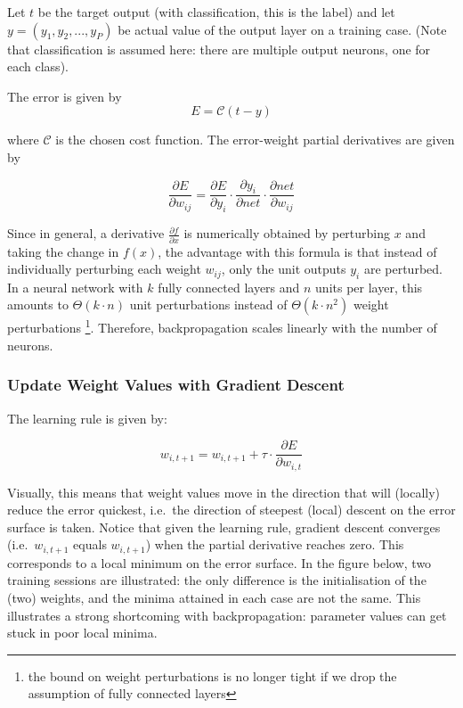 \documentclass[a4paper,11pt]{article}
\begin{document}
Let $t$ be the target output (with classification, this is the label) and let $y = (y_{1}, y_{2}, ..., y_{P})$ be actual value of the output layer on a training case. (Note that classification is assumed here: there are multiple output neurons, one for each class).

The error is given by 
\begin{equation}
E = \mathcal{C}(t-y)
\end{equation}

where $\mathcal{C}$ is the chosen cost function. The error-weight partial derivatives are given by

\begin{equation}
\frac{\partial{E}}{\partial{w_{ij}}} = \frac{\partial{E}}{\partial{y_{i}}} \cdot \frac{\partial{y_{i}}}{\partial{net}} \cdot \frac{\partial{net}}{\partial{w_{ij}}}
\end{equation}

Since in general, a derivative $\frac{\partial{f}}{\partial{x}}$ is numerically obtained by perturbing $x$ and taking the change in $f(x)$, the advantage with this formula is that instead of individually perturbing each weight $w_{ij}$, only the unit outputs $y_{i}$ are perturbed. In a neural network with $k$ fully connected layers and $n$ units per layer, this amounts to $\Theta(k \cdot n)$ unit perturbations instead of $\Theta(k \cdot n^{2})$ weight perturbations \footnote{the bound on weight perturbations is no longer tight if we drop the assumption of fully connected layers}. Therefore, backpropagation scales linearly with the number of neurons. \\

\subsubsection{Update Weight Values with Gradient Descent}

The learning rule is given by:

\begin{equation}
 w_{i,t+1} = w_{i,t+1} + \tau \cdot \frac{\partial{E}}{\partial{w_{i,t}}}
 \label{eqn:learning_rule}
\end{equation}

Visually, this means that weight values move in the direction that will (locally) reduce the error quickest, i.e.\ the direction of steepest (local) descent on the error surface is taken. Notice that given the learning rule, gradient descent converges (i.e.\ $w_{i,t+1}$ equals $w_{i,t+1}$) when the partial derivative reaches zero. This corresponds to a local minimum on the error surface. In the figure below, two training sessions are illustrated: the only difference is the initialisation of the (two) weights, and the minima attained in each case are not the same. This illustrates a strong shortcoming with backpropagation: parameter values can get stuck in poor local minima.
\end{document}
